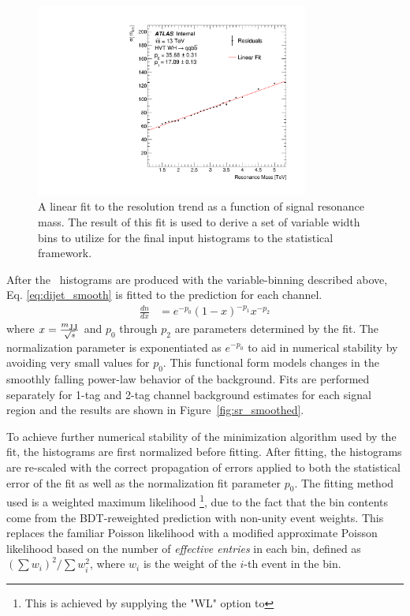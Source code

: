 \begin{figure}[htbp!]
\begin{center}
    \includegraphics[width=0.8\textwidth]{VHqqbb_WH_ResoTrendCrystalBall.pdf}
\end{center}
\caption{A linear fit to the \mvh resolution trend as a function of signal resonance mass.
The result of this fit is used to derive a set of variable width bins to utilize for the final input histograms to the statistical framework.}
\label{fig:mvh_reso_trend}
\end{figure}

After the \mvh\ histograms are produced with the variable-binning described above, Eq. \ref{eq:dijet_smooth} is fitted to the prediction for each channel.
\begin{align}
    \frac{dn}{dx} &= e^{-p_0} \left(1 - x\right)^{-p_1} x^{-p_2}
    \label{eq:dijet_smooth}
\end{align}
where $x = \frac{m\textsubscript{JJ}}{\sqrt{s}}$ and $p_0$ through $p_2$ are parameters determined by the fit.
The normalization parameter is exponentiated as $e^{-p_0}$ to aid in numerical stability by avoiding very small values for $p_0$.
This functional form models changes in the smoothly falling power-law behavior of the background.
Fits are performed separately for 1-tag and 2-tag channel background estimates for each signal region and the results are shown in Figure~\ref{fig:sr_smoothed}.

To achieve further numerical stability of the minimization algorithm used by the fit, the histograms are first normalized before fitting.
After fitting, the histograms are re-scaled with the correct propagation of errors applied to both the statistical error of the fit as well as the normalization fit parameter $p_0$.
The fitting method used is a weighted maximum likelihood \footnote{This is achieved by supplying the "WL" option to }, due to the fact that the bin contents come from the BDT-reweighted prediction with non-unity event weights.
This replaces the familiar Poisson likelihood with a modified approximate Poisson likelihood based on the number of \textit{effective entries} in each bin, defined as $\left(\sum w_i \right)^2 / \sum w_i^2$, where $w_i$ is the weight of the $i$-th event in the bin.

